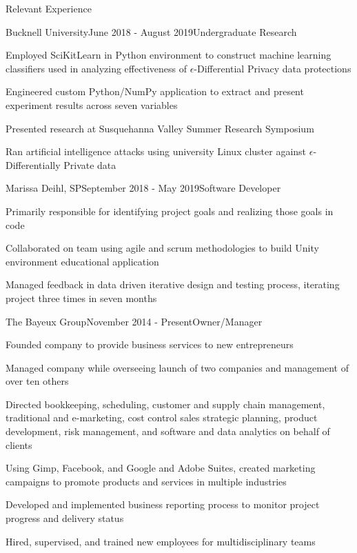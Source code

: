 \documentclass{resume} %
\begin{document}
\begin{rSection}{Relevant Experience}

\begin{rWorkSubsection}{Bucknell University}{June 2018 - August 2019}{Undergraduate Research}{}
\item Employed SciKitLearn in Python environment to construct machine learning classifiers used in analyzing effectiveness of $\epsilon$-Differential Privacy data protections
\item Engineered custom Python/NumPy application to extract and present experiment results across seven variables
\item Presented research at Susquehanna Valley Summer Research Symposium
\item Ran artificial intelligence attacks using university Linux cluster against $\epsilon$-Differentially Private data
\end{rWorkSubsection}


\begin{rWorkSubsection}{Marissa Deihl, SP}{September 2018 - May 2019}{Software Developer}{}
\item Primarily responsible for identifying project goals and realizing those goals in code
\item Collaborated on team using agile and scrum methodologies to build Unity environment educational application
\item Managed feedback in data driven iterative design and testing process, iterating project three times in seven months
\end{rWorkSubsection}


\begin{rWorkSubsection}{The Bayeux Group}{November 2014 - Present}{Owner/Manager}{}
\item Founded company to provide business services to new entrepreneurs
\item Managed company while overseeing launch of two companies and management of over ten others
\item Directed bookkeeping, scheduling, customer and supply chain management, traditional and e-marketing, cost control sales strategic planning, product development, risk management, and software and data analytics on behalf of clients
\item Using Gimp, Facebook, and Google and Adobe Suites, created marketing campaigns to promote products and services in multiple industries
\item Developed and implemented business reporting process to monitor project progress and delivery status
\item Hired, supervised, and trained new employees for multidisciplinary teams
\end{rWorkSubsection}


\end{rSection}
\end{document}
